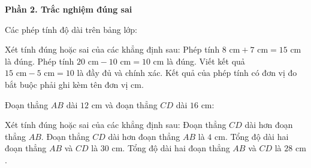 \textbf{Phần 2. Trắc nghiệm đúng sai}

\begin{ex} %
Các phép tính độ dài trên bảng lớp:
\begin{center}
\end{center}
Xét tính đúng hoặc sai của các khẳng định sau:
\choiceTF
{\True Phép tính $8\text{ cm} + 7\text{ cm} = 15\text{ cm}$ là đúng.}
{\True Phép tính $20\text{ cm} - 10\text{ cm} = 10\text{ cm}$ là đúng.}
{Viết kết quả $15\text{ cm} - 5\text{ cm} = 10$ là đầy đủ và chính xác.}
{\True Kết quả của phép tính có đơn vị đo bắt buộc phải ghi kèm tên đơn vị $\text{cm}$.}
\end{ex}

\begin{ex} %
Đoạn thẳng $AB$ dài $12\text{ cm}$ và đoạn thẳng $CD$ dài $16\text{ cm}$:
\begin{center}
\end{center}
Xét tính đúng hoặc sai của các khẳng định sau:
\choiceTF
{\True Đoạn thẳng $CD$ dài hơn đoạn thẳng $AB$.}
{\True Đoạn thẳng $CD$ dài hơn đoạn thẳng $AB$ là $4\text{ cm}$.}
{Tổng độ dài hai đoạn thẳng $AB$ và $CD$ là $30\text{ cm}$.}
{\True Tổng độ dài hai đoạn thẳng $AB$ và $CD$ là $28\text{ cm}$.}
\end{ex}

